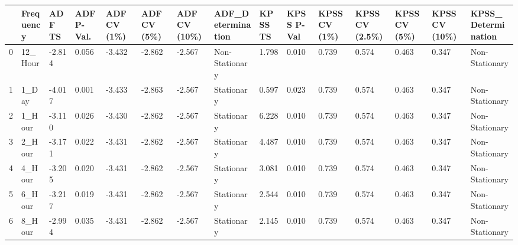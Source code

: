\begin{tabular}{lllllllllllllll}
\toprule
 & Frequency & ADF TS & ADF P-Val. & ADF CV (1\%) & ADF CV (5\%) & ADF CV (10\%) & ADF_Determination & KPSS TS & KPSS P-Val & KPSS CV (1\%) & KPSS CV (2.5\%) & KPSS CV (5\%) & KPSS CV (10\%) & KPSS_Determination \\
\midrule
0 & 12_Hour & -2.814 & 0.056 & -3.432 & -2.862 & -2.567 & Non-Stationary & 1.798 & 0.010 & 0.739 & 0.574 & 0.463 & 0.347 & Non-Stationary \\
1 & 1_Day & -4.017 & 0.001 & -3.433 & -2.863 & -2.567 & Stationary & 0.597 & 0.023 & 0.739 & 0.574 & 0.463 & 0.347 & Non-Stationary \\
2 & 1_Hour & -3.110 & 0.026 & -3.430 & -2.862 & -2.567 & Stationary & 6.228 & 0.010 & 0.739 & 0.574 & 0.463 & 0.347 & Non-Stationary \\
3 & 2_Hour & -3.171 & 0.022 & -3.431 & -2.862 & -2.567 & Stationary & 4.487 & 0.010 & 0.739 & 0.574 & 0.463 & 0.347 & Non-Stationary \\
4 & 4_Hour & -3.205 & 0.020 & -3.431 & -2.862 & -2.567 & Stationary & 3.081 & 0.010 & 0.739 & 0.574 & 0.463 & 0.347 & Non-Stationary \\
5 & 6_Hour & -3.217 & 0.019 & -3.431 & -2.862 & -2.567 & Stationary & 2.544 & 0.010 & 0.739 & 0.574 & 0.463 & 0.347 & Non-Stationary \\
6 & 8_Hour & -2.994 & 0.035 & -3.431 & -2.862 & -2.567 & Stationary & 2.145 & 0.010 & 0.739 & 0.574 & 0.463 & 0.347 & Non-Stationary \\
\bottomrule
\end{tabular}
